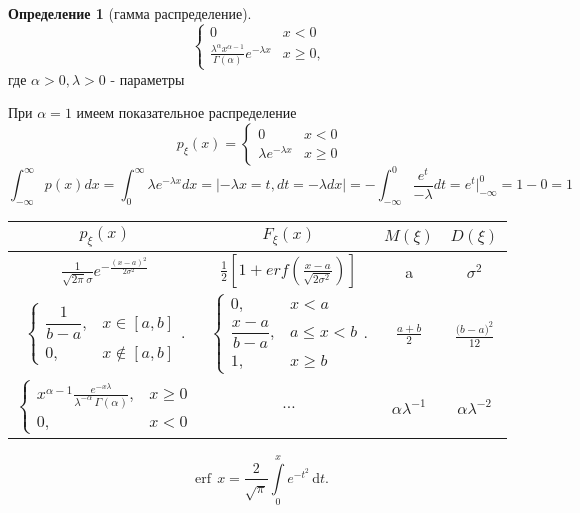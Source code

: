 \documentclass[a4paper]{article}
\theoremstyle{definition}
\newtheorem*{definition}{Определение}
\theoremstyle{remark}
\begin{document}
\begin{enumerate}
\begin{definition}[гамма распределение]
\[\begin{cases}
            0 & x< 0 \\
            \frac{\lambda^\alpha x^{\alpha-1}}{\Gamma(\alpha)}e^{-\lambda x} & x\ge 0,
        \end{cases}\]
        где $\alpha > 0, \lambda > 0$ - параметры
    \end{definition}
    При $\alpha = 1$ имеем показательное распределение
    \[p_\xi(x) = \begin{cases}
        0 & x< 0 \\
            \lambda e^{-\lambda x} & x\ge 0
    \end{cases}\]
    \[\int_{-\infty}^{\infty}p(x) dx  = \int_{0}^{\infty} \lambda e^{-\lambda x} dx = |-\lambda x = t, dt =  - \lambda dx| = -\int_{-\infty}^{0} \frac{e^t }{-\lambda} dt = e^t {|}_{-\infty}^0 = 1 - 0 = 1\]
\end{enumerate}
\begin{center}
    \begin{tabular}{ |c c c c| }
        \hline
        $p_\xi(x)$ & $F_\xi(x)$ & $M(\xi)$ & $D(\xi)$ \\ 
        \hline
        $\frac1{\sqrt{2\pi}\sigma} e^{-\frac{(x-a)^2}{2\sigma^2}}$ & $\frac12 [1 + erf(\frac{x-a}{\sqrt{2\sigma^2}})]$ & a  & $\sigma^2$\\ 
        
        ${\displaystyle\left\{{\begin{matrix}{\dfrac {1}{b-a}},&x\in [a,b]\\0,&x\not \in [a,b]\end{matrix}}\right..}$ &
        ${\displaystyle \left\{{\begin{matrix}0,&x<a\\{\dfrac {x-a}{b-a}},&a\leqslant x<b\\1,&x\geqslant b\end{matrix}}\right..}$ &
        $\frac{a+b}2$ & $\frac{{(b-a})^2}{12}$ \\


        $\displaystyle\left\{{\begin{matrix}x^{{\alpha-1}}{\frac  {e^{{-x\lambda }}}{\lambda ^{-\alpha}\,\Gamma (\alpha)}},&x\geq 0\\0,&x<0\end{matrix}}\right.$ & $\dots$ & $\alpha \lambda^{-1}$ & $\alpha \lambda^{-2}$ \\
        
     \hline
    \end{tabular}
    \end{center}
    \[\operatorname {erf}\,x={\frac  {2}{{\sqrt  {\pi }}}}\int \limits _{0}^{x}e^{{-t^{2}}}\,{\mathrm  d}t.\]
\end{document}
